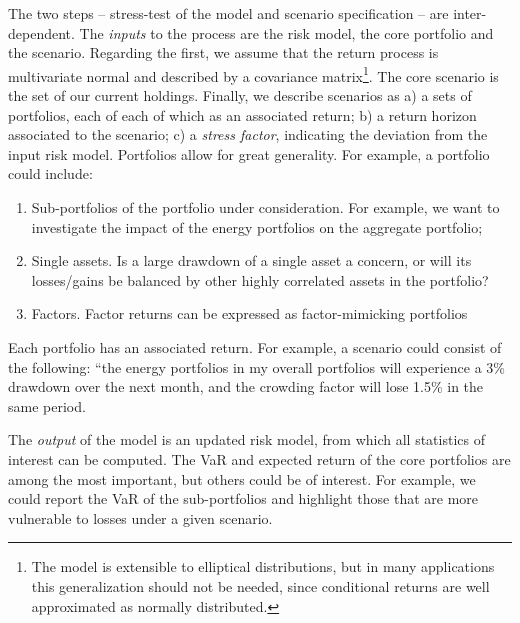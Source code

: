 \documentclass[letter, 12pt]{article}
\begin{document}
The two steps -- stress-test of the model and scenario specification -- are inter-dependent. The \emph{inputs} to the process are the risk model, the core portfolio and the scenario. Regarding the first, we assume that the return process is multivariate normal and described by a covariance matrix\footnote{The model is extensible to elliptical distributions, but in many applications this generalization should not be needed, since conditional returns are well approximated as normally distributed.}. The core scenario is the set of our current holdings. Finally, we describe scenarios as a) a sets of portfolios, each of each of which as an associated return; b) a return horizon associated to the scenario; c) a \emph{stress factor}, indicating the deviation from the input risk model. Portfolios allow for great generality. For example, a portfolio could include:
\begin{enumerate}

\item  Sub-portfolios of the portfolio under consideration. For example, we want to investigate the impact of the energy portfolios on the aggregate portfolio;
\item Single assets. Is a large drawdown of a single asset a concern, or will its losses/gains be balanced by other highly correlated assets in the portfolio?
\item Factors. Factor returns can be expressed as factor-mimicking portfolios
\end{enumerate}
Each portfolio has an associated return. For example, a scenario could consist of the following: ``the energy portfolios in my overall portfolios will experience a 3\% drawdown over the next month, and the crowding factor will lose 1.5\% in the same period.

The \emph{output} of the model is an updated risk model, from which all statistics of interest can be computed. The VaR and expected return of the core portfolios are among the most important, but others could be of interest. For example, we could report the VaR of the sub-portfolios and highlight those that are more vulnerable to losses under a given scenario.
\end{document}
